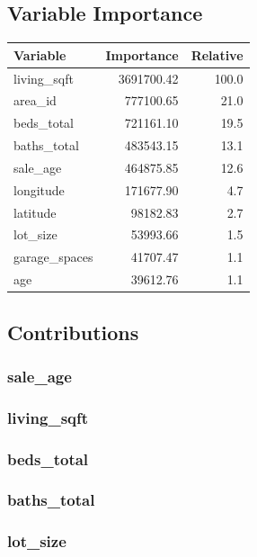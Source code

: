 \documentclass[
]{article}
\begin{document}
\subsection{Variable Importance}\label{variable-importance}

{\def\LTcaptype{} %
\begin{longtable}[]{@{}lrr@{}}
\toprule\noalign{}
Variable & Importance & Relative \\
\midrule\noalign{}
\endhead
\bottomrule\noalign{}
\endlastfoot
living\_sqft & 3691700.42 & 100.0 \\
area\_id & 777100.65 & 21.0 \\
beds\_total & 721161.10 & 19.5 \\
baths\_total & 483543.15 & 13.1 \\
sale\_age & 464875.85 & 12.6 \\
longitude & 171677.90 & 4.7 \\
latitude & 98182.83 & 2.7 \\
lot\_size & 53993.66 & 1.5 \\
garage\_spaces & 41707.47 & 1.1 \\
age & 39612.76 & 1.1 \\
\end{longtable}
}

\subsection{Contributions}\label{contributions}

\subsubsection{sale\_age}\label{sale_age}

\subsubsection{living\_sqft}\label{living_sqft}

\subsubsection{beds\_total}\label{beds_total}

\subsubsection{baths\_total}\label{baths_total}

\subsubsection{lot\_size}\label{lot_size}
\end{document}
